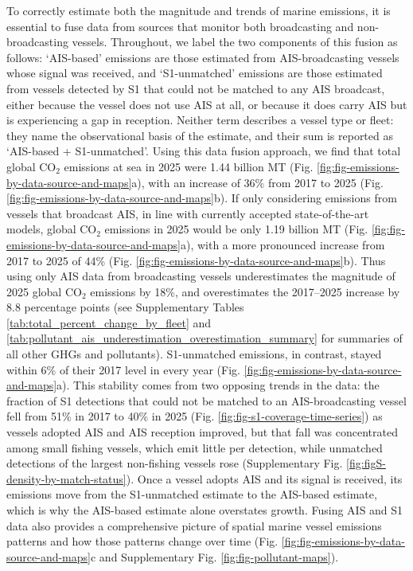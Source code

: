 \documentclass[lineno,pdflatex,sn-nature]{sn-jnl}
\begin{document}
To correctly estimate both the magnitude and trends of marine emissions, it is essential to fuse data from sources that monitor both broadcasting and non-broadcasting vessels. Throughout, we label the two components of this fusion as follows: `AIS-based' emissions are those estimated from AIS-broadcasting vessels whose signal was received, and `S1-unmatched' emissions are those estimated from vessels detected by S1 that could not be matched to any AIS broadcast, either because the vessel does not use AIS at all, or because it does carry AIS but is experiencing a gap in reception. Neither term describes a vessel type or fleet: they name the observational basis of the estimate, and their sum is reported as `AIS-based + S1-unmatched'. Using this data fusion approach, we find that total global CO$_{2}$ emissions at sea in 2025 were 1.44 billion MT (Fig. \ref{fig:fig-emissions-by-data-source-and-maps}a), with an increase of 36\% from 2017 to 2025 (Fig. \ref{fig:fig-emissions-by-data-source-and-maps}b). If only considering emissions from vessels that broadcast AIS, in line with currently accepted state-of-the-art models, global CO$_{2}$ emissions in 2025 would be only 1.19 billion MT (Fig. \ref{fig:fig-emissions-by-data-source-and-maps}a), with a more pronounced increase from 2017 to 2025 of 44\% (Fig. \ref{fig:fig-emissions-by-data-source-and-maps}b). Thus using only AIS data from broadcasting vessels underestimates the magnitude of 2025 global CO$_{2}$ emissions by 18\%, and overestimates the 2017--2025 increase by 8.8 percentage points (see Supplementary Tables \ref{tab:total_percent_change_by_fleet} and \ref{tab:pollutant_ais_underestimation_overestimation_summary} for summaries of all other GHGs and pollutants). S1-unmatched emissions, in contrast, stayed within 6\% of their 2017 level in every year (Fig. \ref{fig:fig-emissions-by-data-source-and-maps}a). This stability comes from two opposing trends in the data: the fraction of S1 detections that could not be matched to an AIS-broadcasting vessel fell from 51\% in 2017 to 40\% in 2025 (Fig. \ref{fig:fig-s1-coverage-time-series}) as vessels adopted AIS and AIS reception improved, but that fall was concentrated among small fishing vessels, which emit little per detection, while unmatched detections of the largest non-fishing vessels rose (Supplementary Fig. \ref{fig:figS-density-by-match-status}). Once a vessel adopts AIS and its signal is received, its emissions move from the S1-unmatched estimate to the AIS-based estimate, which is why the AIS-based estimate alone overstates growth. Fusing AIS and S1 data also provides a comprehensive picture of spatial marine vessel emissions patterns and how those patterns change over time (Fig. \ref{fig:fig-emissions-by-data-source-and-maps}c and Supplementary Fig. \ref{fig:fig-pollutant-maps}).
\end{document}
